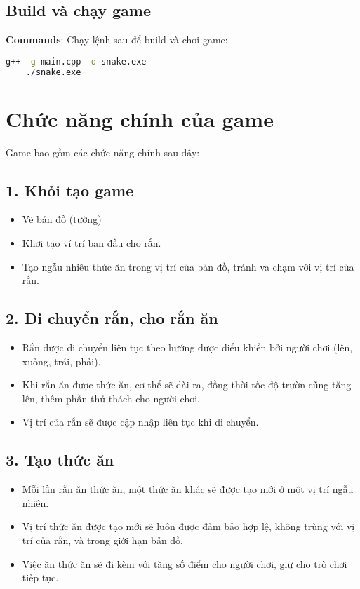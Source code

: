 \documentclass[12pt]{report}
\begin{document}
\subsection*{Build và chạy game}
\textbf{Commands}: Chạy lệnh sau để build và chơi game:
\begin{lstlisting}[language=bash]
    g++ -g main.cpp -o snake.exe
    ./snake.exe
\end{lstlisting}

\section{Chức năng chính của game}
Game bao gồm các chức năng chính sau đây:
\subsection*{1. Khỏi tạo game}
\begin{itemize}
    \item Vẽ bản đồ (tường)
    \item Khơi tạo ví trí ban đầu cho rắn.
    \item Tạo ngẫu nhiêu thức ăn trong vị trí của bản đồ, tránh va chạm với vị trí của rắn.
\end{itemize}

\subsection*{2. Di chuyển rắn, cho rắn ăn}
\begin{itemize}
    \item Rắn được di chuyển liên tục theo hướng được điểu khiển bởi người chơi (lên, xuống, trái, phải).
    \item Khi rắn ăn được thức ăn, cơ thể sẽ dài ra, đồng thời tốc độ trườn cũng tăng lên, thêm phần thử thách cho người chơi.
    \item Vị trí của rắn sẽ được cập nhập liên tục khi di chuyển.
\end{itemize}

\subsection*{3. Tạo thức ăn}
\begin{itemize}
    \item Mỗi lần rắn ăn thức ăn, một thức ăn khác sẽ được tạo mới ở một vị trí ngẫu nhiên.
    \item Vị trí thức ăn được tạo mới sẽ luôn được đảm bảo hợp lệ, không trùng với vị trí của rắn, và trong giới hạn bản đồ.
    \item Việc ăn thức ăn sẽ đi kèm với tăng số điểm cho người chơi, giữ cho trò chơi tiếp tục.
\end{itemize}
\end{document}
